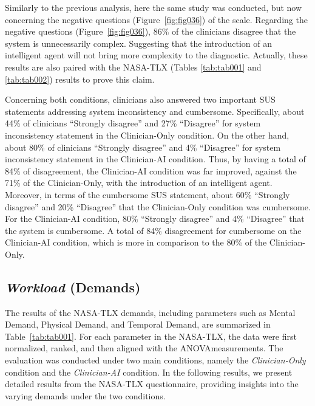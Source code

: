 Similarly to the previous analysis, here the same study was conducted, but now concerning the negative questions (Figure~\ref{fig:fig036}) of the scale.
Regarding the negative questions (Figure~\ref{fig:fig036}), 86\% of the clinicians disagree that the system is unnecessarily complex.
Suggesting that the introduction of an intelligent agent will not bring more complexity to the diagnostic.
Actually, these results are also paired with the \ac{NASA-TLX} (Tables \ref{tab:tab001} and \ref{tab:tab002}) results to prove this claim.

Concerning both conditions, clinicians also answered two important \ac{SUS} statements addressing system inconsistency and cumbersome.
Specifically, about 44\% of clinicians ``Strongly disagree'' and 27\% ``Disagree'' for system inconsistency statement in the Clinician-Only condition.
On the other hand, about 80\% of clinicians ``Strongly disagree'' and 4\% ``Disagree'' for system inconsistency statement in the Clinician-AI condition.
Thus, by having a total of 84\% of disagreement, the Clinician-AI condition was far improved, against the 71\% of the Clinician-Only, with the introduction of an intelligent agent.
Moreover, in terms of the cumbersome \ac{SUS} statement, about 60\% ``Strongly disagree'' and 20\% ``Disagree'' that the Clinician-Only condition was cumbersome.
For the Clinician-AI condition, 80\% ``Strongly disagree'' and 4\% ``Disagree'' that the system is cumbersome.
A total of 84\% disagreement for cumbersome on the Clinician-AI condition, which is more in comparison to the 80\% of the Clinician-Only.

\subsection{{\it Workload} (Demands)}
\label{sec:app003004003}

The results of the \ac{NASA-TLX} demands, including parameters such as Mental Demand, Physical Demand, and Temporal Demand, are summarized in Table~\ref{tab:tab001}.
For each parameter in the \ac{NASA-TLX}, the data were first normalized, ranked, and then aligned with the \ac{ANOVA}\footnotemark[22] measurements.
The evaluation was conducted under two main conditions, namely the {\it Clinician-Only} condition and the {\it Clinician-AI} condition.
In the following results, we present detailed results from the \ac{NASA-TLX} questionnaire, providing insights into the varying demands under the two conditions.

